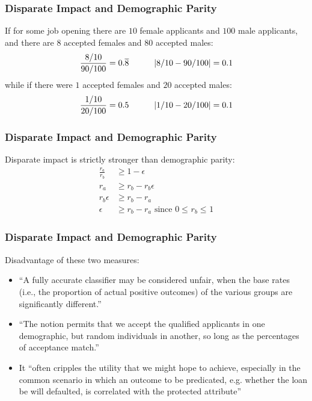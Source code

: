 \documentclass{beamer}
\DeclarePairedDelimiter{\abs}{\lvert}{\rvert}
\let\oldleq\leq
\renewcommand{\leq}[1][]{\oldleq_{#1}}
\begin{document}
\begin{frame}
    \frametitle{Disparate Impact and Demographic Parity}
    If for some job opening there are $10$ female applicants and
    $100$ male applicants, and there are $8$ accepted females
    and $80$ accepted males:
    \[
        \frac{8/10}{90/100} = 0.\overline{8} \quad\quad\quad
        \abs{8/10 - 90/100} = 0.1
    \]
    while if there were $1$ accepted females and $20$ accepted males:
    \[
        \frac{1/10}{20/100} = 0.5 \quad\quad\quad
        \abs{1/10 - 20/100} = 0.1
    \]
\end{frame}

\begin{frame}
    \frametitle{Disparate Impact and Demographic Parity}
    Disparate impact is strictly stronger than demographic parity:
    \begin{align*}
        \frac{r_a}{r_b} & \geq 1 - \epsilon \\
        r_a & \geq r_b - r_b \epsilon \\
        r_b \epsilon & \geq r_b - r_a \\
        \epsilon & \geq r_b - r_a \text{ since } 0 \leq r_b \leq 1
    \end{align*}
\end{frame}

\begin{frame}
    \frametitle{Disparate Impact and Demographic Parity}
    Disadvantage of these two measures:
    \begin{itemize}
        \item ``A fully accurate classifier
        may be considered unfair, when the base rates (i.e., the proportion of
        actual positive outcomes) of the various groups are significantly different.''
        \item ``The notion permits that we accept the qualified applicants in
        one demographic, but random individuals in another, so long as the
        percentages of acceptance match.''
        \item It ``often cripples the utility that we might hope to achieve,
        especially in the common scenario in which an outcome to be predicated,
        e.g. whether the loan be will defaulted, is correlated
        with the protected attribute''
    \end{itemize}
\end{frame}
\end{document}
